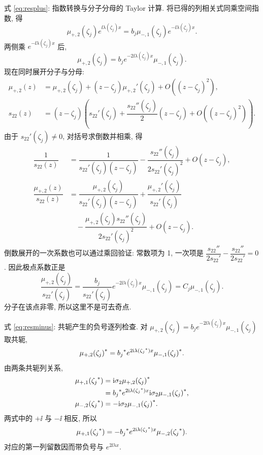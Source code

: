 \par\smallskip\noindent 式 \eqref{eq:resplus}: 指数转换与分子分母的 Taylor 计算.\quad
将已得的列相关式同乘空间指数, 得
\begin{equation*}
\mu_{+,2}(\zeta_j)e^{\ii\lambda(\zeta_j)x}
=b_j\mu_{-,1}(\zeta_j)e^{-\ii\lambda(\zeta_j)x}.
\end{equation*}
两侧乘 $e^{-\ii\lambda(\zeta_j)x}$ 后,
\begin{equation*}
\mu_{+,2}(\zeta_j)
=b_je^{-2\ii\lambda(\zeta_j)x}\mu_{-,1}(\zeta_j).
\end{equation*}
现在同时展开分子与分母:
\begin{align*}
\mu_{+,2}(z)
&=\mu_{+,2}(\zeta_j)+(z-\zeta_j)\mu_{+,2}'(\zeta_j)
+O((z-\zeta_j)^2),\\
s_{22}(z)
&=(z-\zeta_j)\left(s_{22}'(\zeta_j)
+\dfrac{s_{22}''(\zeta_j)}{2}(z-\zeta_j)
+O((z-\zeta_j)^2)\right).
\end{align*}
由于 $s_{22}'(\zeta_j)\ne0$, 对括号求倒数并相乘, 得
\begin{align*}
\dfrac{1}{s_{22}(z)}
&=\dfrac{1}{s_{22}'(\zeta_j)(z-\zeta_j)}
-\dfrac{s_{22}''(\zeta_j)}{2s_{22}'(\zeta_j)^2}
+O(z-\zeta_j),\\
\dfrac{\mu_{+,2}(z)}{s_{22}(z)}
&=\dfrac{\mu_{+,2}(\zeta_j)}{s_{22}'(\zeta_j)(z-\zeta_j)}
+\dfrac{\mu_{+,2}'(\zeta_j)}{s_{22}'(\zeta_j)}\\
&\quad-\dfrac{\mu_{+,2}(\zeta_j)s_{22}''(\zeta_j)}{2s_{22}'(\zeta_j)^2}
+O(z-\zeta_j).
\end{align*}
倒数展开的一次系数也可以通过乘回验证:
常数项为 1, 一次项是
$\dfrac{s_{22}''}{2s_{22}'}-\dfrac{s_{22}''}{2s_{22}'}=0$.
因此极点系数正是
\begin{equation*}
\dfrac{\mu_{+,2}(\zeta_j)}{s_{22}'(\zeta_j)}
=\dfrac{b_j}{s_{22}'(\zeta_j)}e^{-2\ii\lambda(\zeta_j)x}
\mu_{-,1}(\zeta_j)=C_j\mu_{-,1}(\zeta_j).
\end{equation*}
分子在该点非零, 所以这里不是可去奇点.

\par\smallskip\noindent 式 \eqref{eq:resminus}: 共轭产生的负号逐列检查.\quad
对 $\mu_{+,2}(\zeta_j)=b_je^{-2\ii\lambda(\zeta_j)x}\mu_{-,1}(\zeta_j)$ 取共轭,
\begin{equation*}
{\mu_{+,2}(\zeta_j)}^{*}
={b_j}^{*}e^{2\mathrm{i}\lambda({\zeta_j}^{*})x}
{\mu_{-,1}(\zeta_j)}^{*}.
\end{equation*}
由两条共轭列关系,
\begin{align*}
\mu_{+,1}({\zeta_j}^{*})
&=\mathrm{i}\sigma_2{\mu_{+,2}(\zeta_j)}^{*}\\
&={b_j}^{*}e^{2\mathrm{i}\lambda({\zeta_j}^{*})x}
\mathrm{i}\sigma_2{\mu_{-,1}(\zeta_j)}^{*},\\
\mu_{-,2}({\zeta_j}^{*})
&=-\mathrm{i}\sigma_2{\mu_{-,1}(\zeta_j)}^{*}.
\end{align*}
两式中的 $+\ii$ 与 $-\ii$ 相反, 所以
\begin{equation*}
\mu_{+,1}({\zeta_j}^{*})
=-{b_j}^{*}e^{2\mathrm{i}\lambda({\zeta_j}^{*})x}
\mu_{-,2}({\zeta_j}^{*}).
\end{equation*}
对应的第一列留数因而带负号与 $e^{2\ii\lambda x}$.


